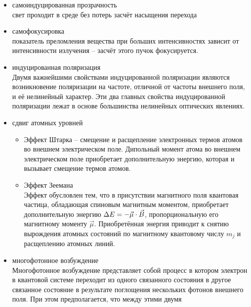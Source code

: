 
\begin{itemize}
    \item самоиндуцированная прозрачность \\
        свет проходит в среде без потерь засчёт насыщения перехода
    \item самофокусировка\\
        показатель преломления вещества при больших интенсивностях зависит
        от интенсивности излучения -- засчёт этого пучок фокусируется.
    \item индуцированная поляризация \\
        Двумя важнейшими свойствами индуцированной поляризации являются
        возникновение поляризации на частоте, отличной от частоты внешнего
        поля, и её нелинейный характер. Эти два главных свойства
        индуцированной поляризации лежат в основе большинства нелинейных
        оптических явлениях.
    \item сдвиг атомных уровней
        \begin{itemize}
            \item Эффект Штарка -- смещение и расщепление электронных
                термов атомов во внешнем электрическом поле. Дипольный
                момент атома во внешнем электрическом поле приобретает
                дополнительную энергию, которая и вызывает смещение
                термов атомов.
            \item Эффект Зеемана \\
                Эффект обусловлен тем, что в присутствии магнитного поля
                квантовая частица, обладающая спиновым магнитным моментом,
                приобретает дополнительную энергию
                \( \Delta E = -\vec{\mu}\cdot\vec{B} \), пропорциональную его
                магнитному моменту \( \vec{\mu} \). Приобретённая энергия
                приводит к снятию вырождения атомных состояний по магнитному
                квантовому числу \( m_j \) и расщеплению атомных линий.
        \end{itemize}
    \item многофотонное возбуждение \\
        Многофотонное возбуждение представляет собой процесс в котором
        электрон в квантовой системе переходит из одного связанного состояния
        в другое связанное состояние в результате поглощения нескольких
        фотонов внешнего поля. При этом предполагается, что между этими двумя

\end{itemize}
